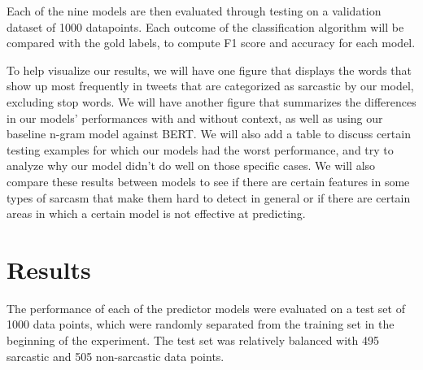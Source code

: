 \documentclass[11pt,a4paper]{article}
\begin{document}
Each of the nine models are then evaluated through testing on a validation dataset of 1000 datapoints. Each outcome of the classification algorithm will be compared with the gold labels, to compute F1 score and accuracy for each model. 

To help visualize our results, we will have one figure that displays the words that show up most frequently in tweets that are categorized as sarcastic by our model, excluding stop words.
We will have another figure that summarizes the differences in our models' performances with and without context, as well as using our baseline n-gram model against BERT.
We will also add a table to discuss certain testing examples for which our models had the worst performance, and try to analyze why our model didn't do well on those specific cases. We will also compare these results between models to see if there are certain features in some types of sarcasm that make them hard to detect in general or if there are certain areas in which a certain model is not effective at predicting.

\section{Results}
The performance of each of the predictor models were evaluated on a test set of 1000 data points, which were randomly separated from the training set in the beginning of the
experiment. The test set was relatively balanced with 495 sarcastic and 505 non-sarcastic data points. 
\end{document}
